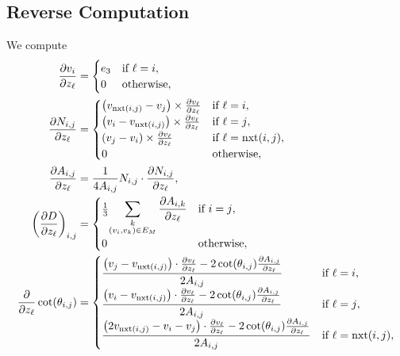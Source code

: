 \subsection{Reverse Computation}
We compute \begin{align*}
	\frac{\partial v_i}{\partial z_\ell} &= \begin{cases}
		e_3 & \text{if \(\ell = i\)}, \\
		0 & \text{otherwise},
	\end{cases} \\
	\frac{\partial N_{i, j}}{\partial z_\ell} &= \begin{cases}
		\pof{v_{\nxt\pof{i, j}} - v_j} \times \frac{\partial v_\ell}{\partial z_\ell} & \text{if \(\ell = i\)}, \\
		\pof{v_i - v_{\nxt\pof{i, j}}} \times \frac{\partial v_\ell}{\partial z_\ell} & \text{if \(\ell = j\)}, \\
		\pof{v_j - v_i} \times \frac{\partial v_\ell}{\partial z_\ell} & \text{if \(\ell = \nxt\pof{i, j}\)}, \\
		0 & \text{otherwise},
	\end{cases} \\
	\frac{\partial A_{i, j}}{\partial z_\ell} &= \frac{1}{4A_{i, j}}N_{i, j} \cdot \frac{\partial N_{i, j}}{\partial z_\ell}, \\
	\pof{\frac{\partial D}{\partial z_\ell}}_{i, j} &= \begin{cases}
		\frac{1}{3}{\displaystyle\sum_{\substack{k \\ \pof{v_i, v_k} \in E_M}}\frac{\partial A_{i, k}}{\partial z_\ell}} & \text{if \(i = j\)}, \\
		0 & \text{otherwise},
	\end{cases} \\
	\frac{\partial}{\partial z_\ell}\cot\pof{\theta_{i, j}} &= \begin{cases}
		\displaystyle\frac{\pof{v_j - v_{\nxt\pof{i, j}}} \cdot \frac{\partial v_\ell}{\partial z_\ell} - 2\cot\pof{\theta_{i, j}}\frac{\partial A_{i, j}}{\partial z_\ell}}{2A_{i, j}} & \text{if \(\ell = i\)}, \\
		\displaystyle\frac{\pof{v_i - v_{\nxt\pof{i, j}}} \cdot \frac{\partial v_\ell}{\partial z_\ell} - 2\cot\pof{\theta_{i, j}}\frac{\partial A_{i, j}}{\partial z_\ell}}{2A_{i, j}} & \text{if \(\ell = j\)}, \\
		\displaystyle\frac{\pof{2v_{\nxt\pof{i, j}} - v_i - v_j} \cdot \frac{\partial v_\ell}{\partial z_\ell} - 2\cot\pof{\theta_{i, j}}\frac{\partial A_{i, j}}{\partial z_\ell}}{2A_{i, j}} & \text{if \(\ell = \nxt\pof{i, j}\)}, \\

\end{cases}
\end{align*}
